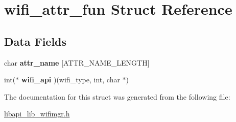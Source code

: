 \hypertarget{structwifi__attr__fun}{}\section{wifi\+\_\+attr\+\_\+fun Struct Reference}
\label{structwifi__attr__fun}
\subsection*{Data Fields}
\begin{DoxyCompactItemize}
\item 
\mbox{\label{structwifi__attr__fun_a17bc268472a9abae6e735d0de6d27b44}} 
char {\bfseries attr\+\_\+name} \mbox{[}A\+T\+T\+R\+\_\+\+N\+A\+M\+E\+\_\+\+L\+E\+N\+G\+TH\mbox{]}
\item 
\mbox{\label{structwifi__attr__fun_aa1232d2e6f7013330d60110dfa0c93f3}} 
int($\ast$ {\bfseries wifi\+\_\+api} )(wifi\+\_\+type, int, char $\ast$)
\end{DoxyCompactItemize}


The documentation for this struct was generated from the following file\+:\begin{DoxyCompactItemize}
\item 
\hyperlink{libapi__lib__wifimgr_8h}{libapi\+\_\+lib\+\_\+wifimgr.\+h}\end{DoxyCompactItemize}

